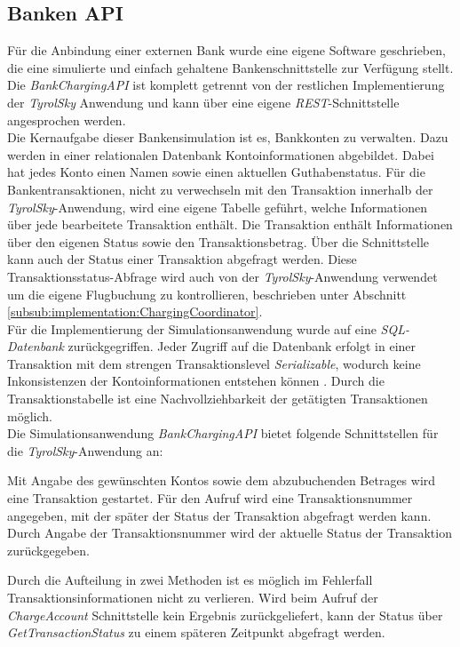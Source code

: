 \subsection{Banken API}
\label{subsec:implementation:bankApi}
Für die Anbindung einer externen Bank wurde eine eigene Software geschrieben, die eine simulierte und einfach gehaltene Bankenschnittstelle zur Verfügung stellt. Die \textit{BankChargingAPI} ist komplett getrennt von der restlichen Implementierung der \textit{TyrolSky} Anwendung und kann über eine eigene \textit{REST}-Schnittstelle angesprochen werden. \\
Die Kernaufgabe dieser Bankensimulation ist es, Bankkonten zu verwalten. Dazu werden in einer relationalen Datenbank Kontoinformationen abgebildet. Dabei hat jedes Konto einen Namen sowie einen aktuellen Guthabenstatus. Für die Bankentransaktionen, nicht zu verwechseln mit den Transaktion innerhalb der \textit{TyrolSky}-Anwendung, wird eine eigene Tabelle geführt, welche Informationen über jede bearbeitete Transaktion enthält. Die Transaktion enthält Informationen über den eigenen Status sowie den Transaktionsbetrag. Über die Schnittstelle kann auch der Status einer Transaktion abgefragt werden. Diese Transaktionsstatus-Abfrage wird auch von der \textit{TyrolSky}-Anwendung verwendet um die eigene Flugbuchung zu kontrollieren, beschrieben unter Abschnitt \ref{subsub:implementation:ChargingCoordinator}. \\
Für die Implementierung der Simulationsanwendung wurde auf eine \textit{SQL-Datenbank} zurückgegriffen. Jeder Zugriff auf die Datenbank erfolgt in einer Transaktion mit dem strengen Transaktionslevel \textit{Serializable}, wodurch keine Inkonsistenzen der Kontoinformationen entstehen können \citep{adya2000generalized}. Durch die Transaktionstabelle ist eine Nachvollziehbarkeit der getätigten Transaktionen möglich. \\
Die Simulationsanwendung \textit{BankChargingAPI} bietet folgende Schnittstellen für die \textit{TyrolSky}-Anwendung an:
\begin{itemize}
    Mit Angabe des gewünschten Kontos sowie dem abzubuchenden Betrages wird eine Transaktion gestartet. Für den Aufruf wird eine Transaktionsnummer angegeben, mit der später der Status der Transaktion abgefragt werden kann.
    Durch Angabe der Transaktionsnummer wird der aktuelle Status der Transaktion zurückgegeben. 
\end{itemize}
Durch die Aufteilung in zwei Methoden ist es möglich im Fehlerfall Transaktionsinformationen nicht zu verlieren. Wird beim Aufruf der \textit{ChargeAccount} Schnittstelle kein Ergebnis zurückgeliefert, kann der Status über \textit{GetTransactionStatus} zu einem späteren Zeitpunkt abgefragt werden.

